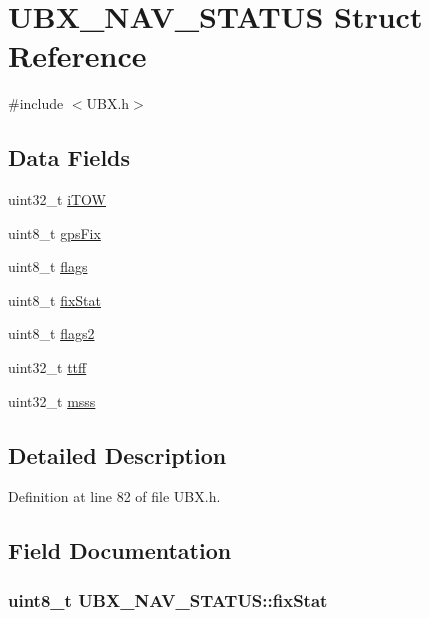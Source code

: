 \hypertarget{struct_u_b_x___n_a_v___s_t_a_t_u_s}{\section{\-U\-B\-X\-\_\-\-N\-A\-V\-\_\-\-S\-T\-A\-T\-U\-S \-Struct \-Reference}
\label{struct_u_b_x___n_a_v___s_t_a_t_u_s}
}


{\ttfamily \#include $<$\-U\-B\-X.\-h$>$}

\subsection*{\-Data \-Fields}
\begin{DoxyCompactItemize}
\item 
uint32\-\_\-t \hyperlink{struct_u_b_x___n_a_v___s_t_a_t_u_s_a8413a77f5cf599f1d89fce98a304c5c1}{i\-T\-O\-W}
\item 
uint8\-\_\-t \hyperlink{struct_u_b_x___n_a_v___s_t_a_t_u_s_a9ada0b00d91062449f398439afec8e70}{gps\-Fix}
\item 
uint8\-\_\-t \hyperlink{struct_u_b_x___n_a_v___s_t_a_t_u_s_a06eed2ab154f7ab69c8a5f5acfbae99c}{flags}
\item 
uint8\-\_\-t \hyperlink{struct_u_b_x___n_a_v___s_t_a_t_u_s_a6c2f59170b7d3a57f1ce01120b735ed1}{fix\-Stat}
\item 
uint8\-\_\-t \hyperlink{struct_u_b_x___n_a_v___s_t_a_t_u_s_a3e1ce741856096d697c3aafd6e66ac61}{flags2}
\item 
uint32\-\_\-t \hyperlink{struct_u_b_x___n_a_v___s_t_a_t_u_s_a9810462abcdcce5e305e41d4d6526699}{ttff}
\item 
uint32\-\_\-t \hyperlink{struct_u_b_x___n_a_v___s_t_a_t_u_s_a41de8d3154dd215b93adeebff5a7972c}{msss}
\end{DoxyCompactItemize}


\subsection{\-Detailed \-Description}


\-Definition at line 82 of file \-U\-B\-X.\-h.



\subsection{\-Field \-Documentation}
\hypertarget{struct_u_b_x___n_a_v___s_t_a_t_u_s_a6c2f59170b7d3a57f1ce01120b735ed1}{
\subsubsection[{fix\-Stat}]{\setlength{\rightskip}{0pt plus 5cm}uint8\-\_\-t {\bf \-U\-B\-X\-\_\-\-N\-A\-V\-\_\-\-S\-T\-A\-T\-U\-S\-::fix\-Stat}}}\label{struct_u_b_x___n_a_v___s_t_a_t_u_s_a6c2f59170b7d3a57f1ce01120b735ed1}


